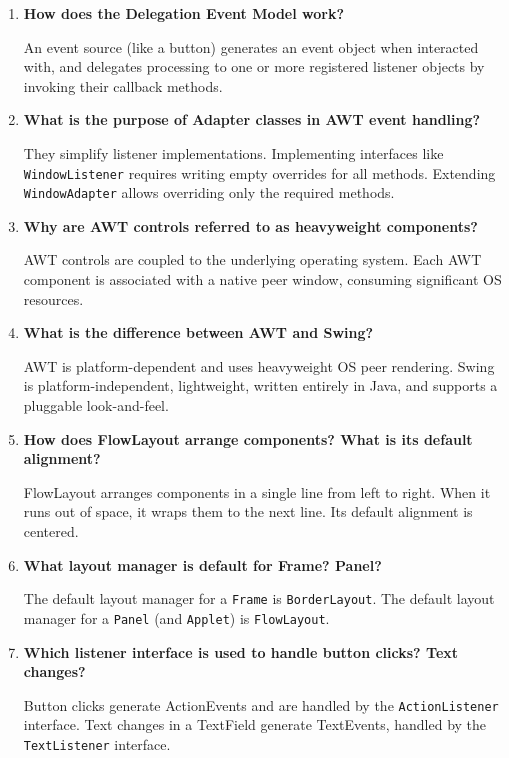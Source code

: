 \documentclass[12pt,a4paper]{article}
\newcommand{\Q}[1]{\textbf{#1}\par\noindent\ignorespaces}
\begin{document}
\begin{tcolorbox}[exambox, title={\textbf{Frequently Asked / Viva Questions}}]
\begin{enumerate}[leftmargin=*, label=\textbf{Q\arabic*.}, itemsep=5pt]
  \item \Q{How does the Delegation Event Model work?}
        An event source (like a button) generates an event object when interacted with, and delegates processing to one or more registered listener objects by invoking their callback methods.
        
  \item \Q{What is the purpose of Adapter classes in AWT event handling?}
        They simplify listener implementations. Implementing interfaces like \texttt{WindowListener} requires writing empty overrides for all methods. Extending \texttt{WindowAdapter} allows overriding only the required methods.
        
  \item \Q{Why are AWT controls referred to as heavyweight components?}
        AWT controls are coupled to the underlying operating system. Each AWT component is associated with a native peer window, consuming significant OS resources.
        
  \item \Q{What is the difference between AWT and Swing?}
        AWT is platform-dependent and uses heavyweight OS peer rendering. Swing is platform-independent, lightweight, written entirely in Java, and supports a pluggable look-and-feel.
        
  \item \Q{How does FlowLayout arrange components? What is its default alignment?}
        FlowLayout arranges components in a single line from left to right. When it runs out of space, it wraps them to the next line. Its default alignment is centered.
        
  \item \Q{What layout manager is default for Frame? Panel?}
        The default layout manager for a \texttt{Frame} is \texttt{BorderLayout}. The default layout manager for a \texttt{Panel} (and \texttt{Applet}) is \texttt{FlowLayout}.
        
  \item \Q{Which listener interface is used to handle button clicks? Text changes?}
        Button clicks generate ActionEvents and are handled by the \texttt{ActionListener} interface. Text changes in a TextField generate TextEvents, handled by the \texttt{TextListener} interface.
        

\end{enumerate}
\end{tcolorbox}
\end{document}

